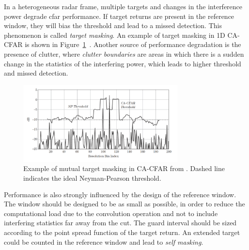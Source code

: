 In a heterogeneous radar frame, multiple targets and changes in the interference power degrade \gls{cfar} performance. If target returns are present in the reference window, they will bias the threshold and lead to a missed detection. This phenomenon is called \textit{target masking}. An example of target masking in 1D CA-CFAR is shown in Figure~\ref{fig:target_masking_richards}~\cite{Richards_Scheer_Holm_2010}.
Another source of performance degradation is the presence of clutter, where \textit{clutter boundaries} are areas in which there is a sudden change in the statistics of the interfering power, which leads to higher threshold and missed detection.
\begin{figure}[b!]
	\centering
	\includegraphics[width=0.75\textwidth]{Images/radar_detect_threshold/target_masking_richards.png}
	\caption{\small Example of mutual target masking in CA-CFAR from \cite{Richards_Scheer_Holm_2010}. Dashed line indicates the ideal Neyman-Pearson threshold.}
	\label{fig:target_masking_richards}
\end{figure}
Performance is also strongly influenced by the design of the reference window. The window should be designed to be as small as possible, in order to reduce the computational load due to the convolution operation and not to include interfering statistics far away from the \gls{cut}. The guard interval should be sized according to the point spread function of the target return. An extended target could be counted in the reference window and lead to \textit{self masking}.
